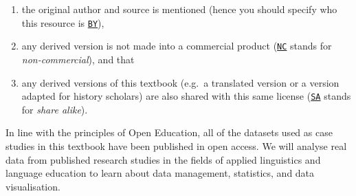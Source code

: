 \documentclass[
  letterpaper,
  DIV=11,
  numbers=noendperiod]{scrreprt}
\begin{document}
\begin{enumerate}
\def\labelenumi{\arabic{enumi}.}
\item
  the original author and source is mentioned (hence you should specify
  who this resource is
  \href{https://creativecommons.org/licenses/by-nc-sa/4.0/}{\texttt{BY}}),
\item
  any derived version is not made into a commercial product
  (\href{https://creativecommons.org/licenses/by-nc-sa/4.0/}{\texttt{NC}}
  stands for \emph{non-commercial}), and that
\item
  any derived versions of this textbook (e.g.~a translated version or a
  version adapted for history scholars) are also shared with this same
  license
  (\href{https://creativecommons.org/licenses/by-nc-sa/4.0/}{\texttt{SA}}
  stands for \emph{share alike}).
\end{enumerate}

In line with the principles of Open Education, all of the datasets used
as case studies in this textbook have been published in open access. We
will analyse real data from published research studies in the fields of
applied linguistics and language education to learn about data
management, statistics, and data visualisation.
\end{document}
